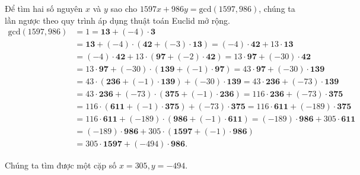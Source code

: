 \begin{example}
    Để tìm hai số nguyên $x$ và $y$ sao cho $1597 x + 986 y = \text{gcd}(1597, 986)$, chúng ta lần ngược theo quy trình áp dụng thuật toán Euclid mở rộng.
    \begin{align*}
        \text{gcd}(1597, 986) & = 1 = \mathbf{13} + (-4)\cdot \mathbf{3}                                                                                          \\
                              & = \mathbf{13} + (-4)\cdot (\mathbf{42} + (-3)\cdot \mathbf{13}) = (-4)\cdot \mathbf{42} + 13\cdot \mathbf{13}                     \\
                              & = (-4)\cdot \mathbf{42} + 13\cdot (\mathbf{97} + (-2)\cdot \mathbf{42}) = 13\cdot \mathbf{97} + (-30)\cdot \mathbf{42}            \\
                              & = 13\cdot \mathbf{97} + (-30)\cdot (\mathbf{139} + (-1)\cdot \mathbf{97}) = 43\cdot \mathbf{97} + (-30)\cdot \mathbf{139}         \\
                              & = 43\cdot (\mathbf{236} + (-1)\cdot \mathbf{139}) + (-30)\cdot \mathbf{139} = 43\cdot \mathbf{236} + (-73)\cdot \mathbf{139}      \\
                              & = 43\cdot \mathbf{236} + (-73)\cdot (\mathbf{375} + (-1)\cdot \mathbf{236}) = 116\cdot \mathbf{236} + (-73)\cdot \mathbf{375}     \\
                              & = 116\cdot (\mathbf{611} + (-1)\cdot \mathbf{375}) + (-73)\cdot \mathbf{375} = 116\cdot \mathbf{611} + (-189)\cdot \mathbf{375}   \\
                              & = 116\cdot \mathbf{611} + (-189)\cdot (\mathbf{986} + (-1)\cdot \mathbf{611})  = (-189)\cdot \mathbf{986} + 305\cdot \mathbf{611} \\
                              & = (-189)\cdot \mathbf{986} + 305\cdot (\mathbf{1597} + (-1)\cdot \mathbf{986})                                                    \\
                              & = 305\cdot \mathbf{1597} + (-494)\cdot \mathbf{986}.
    \end{align*}

    Chúng ta tìm được một cặp số $x = 305, y = -494$.
\end{example}

